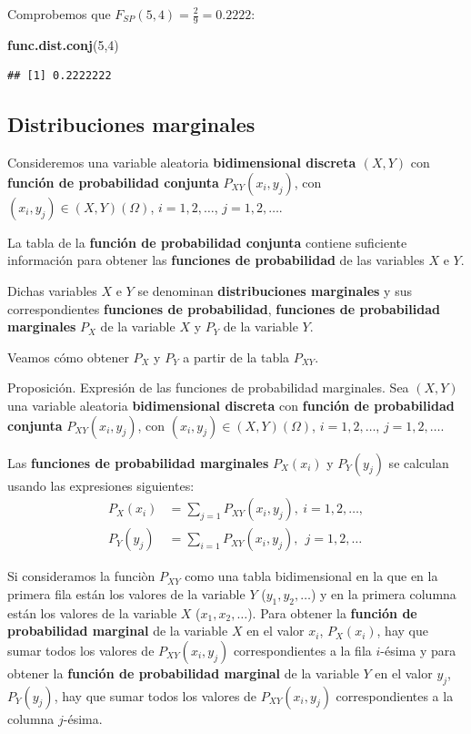 \documentclass[]{book}
\newenvironment{Shaded}{\begin{snugshade}}{\end{snugshade}}
\newcommand{\DecValTok}[1]{\textcolor[rgb]{0.00,0.00,0.81}{#1}}
\newcommand{\KeywordTok}[1]{\textcolor[rgb]{0.13,0.29,0.53}{\textbf{#1}}}
\newcommand{\NormalTok}[1]{#1}
\begin{document}
Comprobemos que \(F_{SP}(5,4)=\frac{2}{9}=0.2222\):

\begin{Shaded}
\begin{Highlighting}[]
\KeywordTok{func.dist.conj}\NormalTok{(}\DecValTok{5}\NormalTok{,}\DecValTok{4}\NormalTok{)}
\end{Highlighting}
\end{Shaded}

\begin{verbatim}
## [1] 0.2222222
\end{verbatim}

\hypertarget{distribuciones-marginales}{%
\subsection{Distribuciones marginales}\label{distribuciones-marginales}}

Consideremos una variable aleatoria \textbf{bidimensional discreta \((X,Y)\)} con \textbf{función de probabilidad conjunta} \(P_{XY}(x_i,y_j)\), con \((x_i,y_j)\in (X,Y)(\Omega)\), \(i=1,2,\ldots\), \(j=1,2,\ldots\).

La tabla de la \textbf{función de probabilidad conjunta} contiene suficiente información para obtener las \textbf{funciones de probabilidad} de las variables \(X\) e \(Y\).

Dichas variables \(X\) e \(Y\) se denominan \textbf{distribuciones marginales} y sus correspondientes \textbf{funciones de probabilidad}, \textbf{funciones de probabilidad marginales} \(P_X\) de la variable \(X\) y \(P_Y\) de la variable \(Y\).

Veamos cómo obtener \(P_X\) y \(P_Y\) a partir de la tabla \(P_{XY}\).

Proposición. Expresión de las funciones de probabilidad marginales.
Sea \((X,Y)\) una variable aleatoria \textbf{bidimensional discreta} con \textbf{función de probabilidad conjunta} \(P_{XY}(x_i,y_j)\), con \((x_i,y_j)\in (X,Y)(\Omega)\), \(i=1,2,\ldots\), \(j=1,2,\ldots\).

Las \textbf{funciones de probabilidad marginales} \(P_X(x_i)\) y \(P_Y(y_j)\) se calculan usando las expresiones siguientes:
\[
\begin{array}{rl}
P_X(x_i)  & = \sum_{j=1} P_{XY}(x_i,y_j),\  i=1,2,\ldots,\\ P_Y(y_j) &  = \sum_{i=1} P_{XY}(x_i,y_j),\ \ j=1,2,\ldots
\end{array}
\]

Si consideramos la funciòn \(P_{XY}\) como una tabla bidimensional en la que en la primera fila están los valores de la variable \(Y\) (\(y_1,y_2,\ldots\)) y en la primera columna están los valores de la variable \(X\) (\(x_1,x_2,\ldots\)). Para obtener la \textbf{función de probabilidad marginal} de la variable \(X\) en el valor \(x_i\), \(P_X(x_i)\), hay que sumar todos los valores de \(P_{XY}(x_i,y_j)\) correspondientes a la fila \(i\)-ésima y para obtener la \textbf{función de probabilidad marginal} de la variable \(Y\) en el valor \(y_j\), \(P_Y(y_j)\), hay que sumar todos los valores de \(P_{XY}(x_i,y_j)\) correspondientes a la columna \(j\)-ésima.
\end{document}
